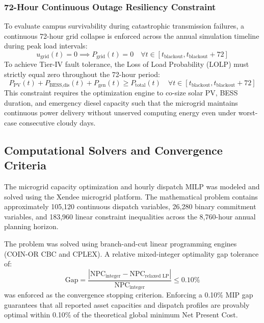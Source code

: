 \documentclass[11pt,a4paper]{article}
\begin{document}
\subsubsection{72-Hour Continuous Outage Resiliency Constraint}
To evaluate campus survivability during catastrophic transmission failures, a continuous 72-hour grid collapse is enforced across the annual simulation timeline during peak load intervals:
\begin{equation}
    u_{\text{grid}}(t) = 0 \implies P_{\text{grid}}(t) = 0 \quad \forall t \in [t_{\text{blackout}}, t_{\text{blackout}} + 72]
    \label{eq:outage_condition}
\end{equation}
To achieve Tier-IV fault tolerance, the Loss of Load Probability ($\text{LOLP}$) must strictly equal zero throughout the 72-hour period:
\begin{equation}
    P_{\text{PV}}(t) + P_{\text{BESS,dis}}(t) + P_{\text{gen}}(t) \ge P_{\text{total}}(t) \quad \forall t \in [t_{\text{blackout}}, t_{\text{blackout}} + 72]
    \label{eq:zero_lolp}
\end{equation}
This constraint requires the optimization engine to co-size solar PV, BESS duration, and emergency diesel capacity such that the microgrid maintains continuous power delivery without unserved computing energy even under worst-case consecutive cloudy days.

\subsection{Computational Solvers and Convergence Criteria}
\label{sec:solvers}

The microgrid capacity optimization and hourly dispatch MILP was modeled and solved using the Xendee microgrid platform. The mathematical problem contains approximately 105,120 continuous dispatch variables, 26,280 binary commitment variables, and 183,960 linear constraint inequalities across the 8,760-hour annual planning horizon.

The problem was solved using branch-and-cut linear programming engines (COIN-OR CBC and CPLEX). A relative mixed-integer optimality gap tolerance of:
\begin{equation}
    \text{Gap} = \frac{|\text{NPC}_{\text{integer}} - \text{NPC}_{\text{relaxed LP}}|}{\text{NPC}_{\text{integer}}} \le 0.10\%
    \label{eq:mip_gap}
\end{equation}
was enforced as the convergence stopping criterion. Enforcing a 0.10\% MIP gap guarantees that all reported asset capacities and dispatch profiles are provably optimal within 0.10\% of the theoretical global minimum Net Present Cost.
\end{document}
